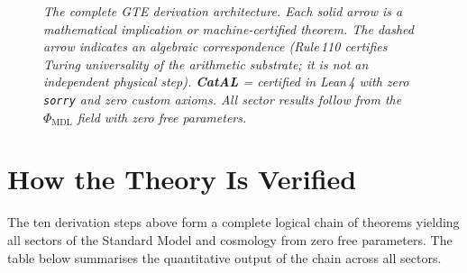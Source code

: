 \documentclass[11pt,openany]{book}
\theoremstyle{remark}
\newcommand{\PHIMDL}{\Phi_{\mathrm{MDL}}}
\begin{document}
\begin{figure}[H]
{%
}%
\vspace{4pt}
\begin{center}
{\small\itshape
The complete GTE derivation architecture.
Each solid arrow is a mathematical implication or machine-certified theorem.
The dashed arrow indicates an algebraic correspondence (Rule\,110 certifies
Turing universality of the arithmetic substrate; it is not an independent
physical step).
\textbf{CatAL} = certified in Lean\,4 with zero \texttt{sorry} and zero custom axioms.
All sector results follow from the $\PHIMDL$ field with zero free parameters.
}
\end{center}
\end{figure}

\clearpage

\section*{How the Theory Is Verified}

The ten derivation steps above form a complete logical chain of theorems yielding all sectors
of the Standard Model and cosmology from zero free parameters.
The table below summarises the quantitative output of the chain across all sectors.
\end{document}
